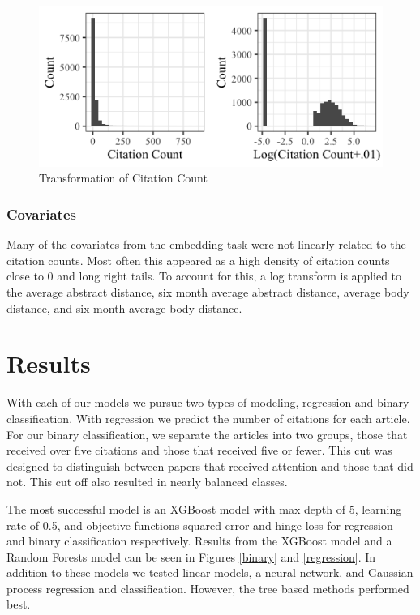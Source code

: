 \documentclass{article} %
\begin{document}
\begin{figure}[h]
\begin{center}
\includegraphics[scale=0.6]{../figures/citation_hist.png} 
\end{center}
\caption{Transformation of Citation Count}
\end{figure}


\subsubsection{Covariates}
Many of the covariates from the embedding task were not linearly related to the citation counts. Most often this appeared as a high density of citation counts close to 0  and long right tails. To account for this, a log transform is applied to the average abstract distance, six month average abstract distance, average body distance, and six month average body distance.


\section{Results}

With each of our models we pursue two types of modeling, regression and binary classification. With regression we predict the number of citations for each article. For our binary classification, we separate the articles into two groups, those that received over five citations and those that received five or fewer. This cut was designed to distinguish between papers that received attention and those that did not. This cut off also resulted in nearly balanced classes.

The most successful model is an XGBoost model with max depth of 5, learning rate of 0.5, and objective functions squared error and hinge loss for regression and binary classification respectively. Results from the XGBoost model and a Random Forests model can be seen in Figures \ref{binary} and \ref{regression}. In addition to these models we tested linear models, a neural network, and Gaussian process regression and classification. However, the tree based methods performed best.
\end{document}
